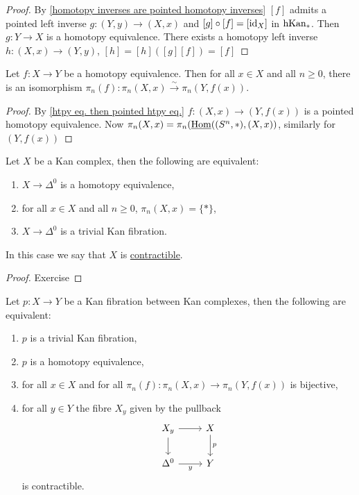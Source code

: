 \begin{proof}
    By \cref{homotopy inverses are pointed homotopy inverses} $[f]$ admits a pointed left inverse 
    $g\colon (Y,y) \to (X,x)$ and $[g] \circ [f] = [\operatorname{id}_X]$ in $\operatorname{hKan}_*$.
    Then $g\colon Y \to X$ is a homotopy equivalence.
    There exists a homotopy left inverse $h\colon (X,x) \to (Y,y)$, $[h]=[h]([g][f])=[f]$
\end{proof}

\begin{cor}
    Let $f\colon X \to Y$ be a homotopy equivalence. 
    Then for all $x \in X$ and all $n \geq 0$, there is an isomorphism $\pi_n(f)\colon \pi_n(X,x) \xrightarrow{\sim} \pi_n(Y,f(x))$.
\end{cor}

\begin{proof}
    By \cref{htpy eq. then pointed htpy eq.} $f\colon (X,x) \to (Y,f(x))$ is a pointed homotopy equivalence.
    Now $\pi_n(X,x) = \pi_n ( \underline{\operatorname{Hom}}((S^n,*),(X,x))$, similarly for $(Y,f(x))$
\end{proof}

\begin{defi/prop}  
\label{contractible Kan complex}
    Let $X$ be a Kan complex, then the following are equivalent:
    \begin{enumerate}
        \item  
        $X \to \Delta^0$ is a homotopy equivalence,
        \item 
        for all $x \in X$ and all $n \geq 0$, $\pi_n(X,x) = \{ *\}$,
        \item 
        $X \to \Delta^0$ is a trivial Kan fibration.
    \end{enumerate}
    In this case we say that $X$ is \underline{contractible}.
\end{defi/prop}

\begin{proof}
    Exercise
\end{proof}

\begin{prop}
    Let $p\colon X \to Y$ be a Kan fibration between Kan complexes, then the following are equivalent:
    \begin{enumerate}
        \item 
        $p$ is a trivial Kan fibration,
        \item 
        $p$ is a homotopy equivalence,
        \item 
        for all $x \in X$ and for all $\pi_n(f)\colon \pi_n(X,x) \to \pi_n(Y,f(x))$ is bijective,
        \item 
        for all $y \in Y$ the fibre $X_y$ given by the pullback 
        \[
        \begin{tikzcd}
            X_y
            \ar[r]
            \ar[d]
            &
            X
            \ar[d,"p"]
            \\
            \Delta^0
            \ar[r,"y"']
            &
            Y
        \end{tikzcd}
        \]
        is contractible.
    \end{enumerate}
\end{prop}

